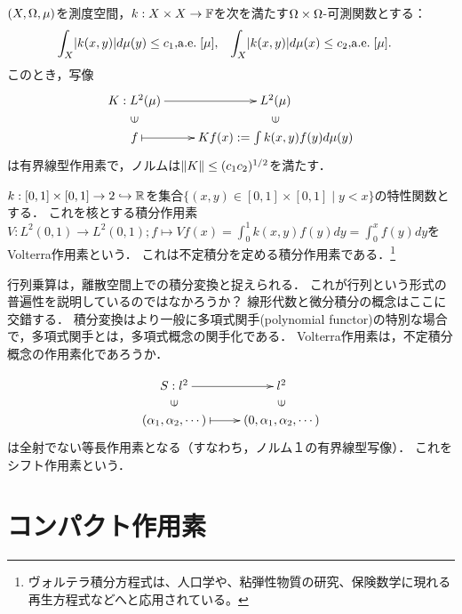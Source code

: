 \documentclass[uplatex,dvipdfmx]{jsreport}
\begin{document}
\begin{theorem}\label{operator-integral-transformation}
    $(X,\Omega,\mu)$を測度空間，$k:X\times X\to\mathbb{F}$を次を満たす$\Omega\times\Omega$-可測関数とする：
    \begin{align*}
        \int_X\lvert k(x,y)\rvert d\mu(y)\le c_1,&\mathrm{a.e.}\;[\mu],&\int_X\lvert k(x,y)\rvert d\mu(x)\le c_2,&\mathrm{a.e.}\;[\mu].
    \end{align*}
    このとき，写像
    \[\xymatrix@R-2pc{
        K:L^2(\mu)\ar[r]&L^2(\mu)\\
        \rotatebox[origin=c]{90}{$\in$}&\rotatebox[origin=c]{90}{$\in$}\\
        f\ar@{|->}[r]&Kf(x):=\int k(x,y)f(y)d\mu(y)
    }\]
    は有界線型作用素で，ノルムは$\|K\|\le(c_1c_2)^{1/2}$を満たす．
\end{theorem}

\begin{example}\label{operator-Volterra}
    $k:[0,1]\times[0,1]\to2\hookrightarrow\mathbb{R}$を集合$\{(x,y)\in[0,1]\times[0,1]\mid y<x\}$の特性関数とする．
    これを核とする積分作用素$V:L^2(0,1)\to L^2(0,1);f\mapsto Vf(x)=\int^1_0k(x,y)f(y)dy=\int^x_0f(y)dy$をVolterra作用素という．
    これは不定積分を定める積分作用素である．\footnote{ヴォルテラ積分方程式は、人口学や、粘弾性物質の研究、保険数学に現れる再生方程式などへと応用されている。}
\end{example}

\begin{example}
    行列乗算は，離散空間上での積分変換と捉えられる．
    これが行列という形式の普遍性を説明しているのではなかろうか？
    線形代数と微分積分の概念はここに交錯する．
    積分変換はより一般に多項式関手(polynomial functor)の特別な場合で，多項式関手とは，多項式概念の関手化である．
    Volterra作用素は，不定積分概念の作用素化であろうか．
\end{example}

\begin{example}\label{operator-unilateral-shift}
    \[\xymatrix@R-2pc{
        S:l^2\ar[r]&l^2\\
        \rotatebox[origin=c]{90}{$\in$}&\rotatebox[origin=c]{90}{$\in$}\\
        (\al_1,\al_2,\cdots)\ar@{|->}[r]&(0,\al_1,\al_2,\cdots)
    }\]
    は全射でない等長作用素となる（すなわち，ノルム１の有界線型写像）．
    これをシフト作用素という．
\end{example}


\section{コンパクト作用素}
\end{document}
